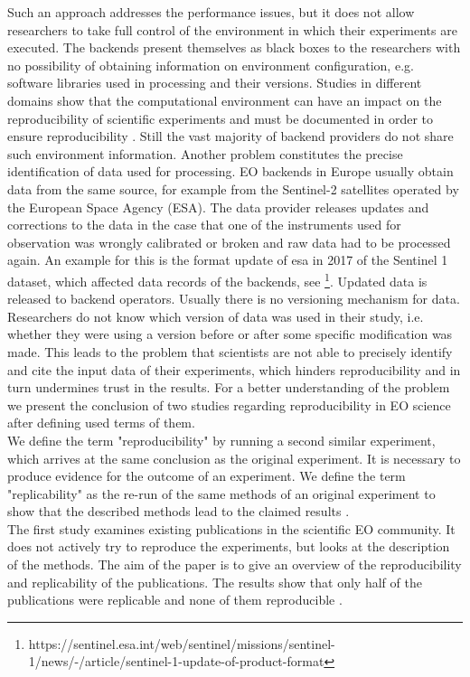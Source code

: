 \documentclass[draft,final]{vutinfth} %
\newcommand{\bgoesswein}[1]{{\color{blue}#1}}
\begin{document}
Such an approach addresses the performance issues, but it does not allow researchers to take full control of the environment in which their experiments are executed. The backends present themselves as black boxes to the researchers with no possibility of obtaining information on environment configuration, e.g. software libraries used in processing and their versions. Studies in different domains show that the computational environment can have an impact on the reproducibility of scientific experiments and must be documented in order to ensure reproducibility \cite{Freesurfer} \cite{Thestateofreproducibility}  \cite{MiksaBiomedical}. Still the vast majority of backend providers do not share such environment information. Another problem constitutes the precise identification of data used for processing. EO backends in Europe usually obtain data from the same source, for example from the Sentinel-2 satellites operated by the European Space Agency (ESA). The data provider releases updates and corrections to the data in the case that one of the instruments used for observation was wrongly calibrated or broken and raw data had to be processed again. An example for this is the format update of \gls{esa} in 2017 of the Sentinel 1 dataset, which affected data records of the backends, see \footnote{https://sentinel.esa.int/web/sentinel/missions/sentinel-1/news/-/article/sentinel-1-update-of-product-format}. Updated data is released to backend operators. Usually there is no versioning mechanism for data. Researchers do not know which version of data was used in their study, i.e. whether they were using a version before or after some specific modification was made. This leads to the problem that scientists are not able to precisely identify and cite the input data of their experiments, which hinders reproducibility and in turn undermines trust in the results. For a better understanding of the problem we present the conclusion of two studies regarding reproducibility in EO science after defining used terms of them. \\
We define the term "reproducibility" by running a second \bgoesswein{similar} \gls{experiment}, which arrives at the same conclusion as the original experiment. It is necessary to produce evidence for the outcome of an experiment. We define the term "replicability" as the re-run of the same methods of an original experiment to show that the described methods lead to the claimed results \cite{reprovsrepli}. \\
The first study examines existing publications in the scientific EO community. It does not actively try to reproduce the experiments, but looks at the description of the methods. The aim of the paper is to give an overview of the reproducibility and replicability of the publications. The results show that only half of the publications were replicable and none of them reproducible \cite{Ostermann2017AdvancingSW}. \\
\end{document}
